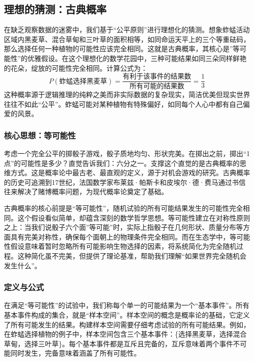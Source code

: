 \documentclass[
  twoside,12pt,fontset=none]{ctexbook}
\begin{document}
\hypertarget{ux7406ux60f3ux7684ux731cux6d4bux53e4ux5178ux6982ux7387}{%
\subsection{理想的猜测：古典概率}\label{ux7406ux60f3ux7684ux731cux6d4bux53e4ux5178ux6982ux7387}}

在缺乏观察数据的迷雾中，我们基于``公平原则''进行理想化的猜测。想象蚱蜢活动区域内黑麦草、混合草甸和三叶草的面积相等，如同命运天平上的三个等重砝码，那么选择任何一种植物的可能性应该完全相同。这就是古典概率，其核心是''等可能性''的优雅假设。在这个理想化的数学花园中，三种可能结果如同三朵同样鲜艳的花朵，绽放的可能性完全相同。计算公式为： \[P(\text{蚱蜢选择黑麦草}) = \frac{\text{有利于该事件的结果数}}{\text{所有可能的结果数}} = \frac{1}{3}\] 这种概率源于逻辑推理的纯粹之美而非实际数据的复杂现实，简洁优美但现实世界往往不如此``公平''。蚱蜢可能对某种植物有特殊偏好，如同每个人心中都有自己偏爱的风景。

\hypertarget{ux6838ux5fc3ux601dux60f3ux7b49ux53efux80fdux6027}{%
\subsubsection{核心思想：等可能性}\label{ux6838ux5fc3ux601dux60f3ux7b49ux53efux80fdux6027}}

考虑一个完全公平的掷骰子游戏，骰子质地均匀、形状完美。在掷出之前，掷出``1点''的可能性是多少？直觉告诉我们：六分之一。支撑这个直觉的是古典概率的思维方式。这是概率论中最古老、最直观的定义，源于对机会游戏的研究。古典概率的历史可追溯到17世纪，法国数学家布莱兹·帕斯卡和皮埃尔·德·费马通过书信往来解决了赌博概率问题，为现代概率论奠定了基础。

古典概率的核心前提是``等可能性''，随机试验的所有可能结果发生的可能性完全相同。这个假设看似简单，却蕴含深刻的数学哲学思想。等可能性建立在对称性原则之上：当我们说骰子六个面''等可能''时，实际上指骰子在几何形状、质量分布等方面具有完美对称性，确保每个面朝上的物理条件完全相同。而在生态学中，等可能性假设意味着暂时忽略所有可能影响生物选择的因素，将系统简化为完全随机过程。这种简化虽不完美，但提供了理论基准，帮助我们理解``如果世界完全随机会发生什么''。

\hypertarget{ux5b9aux4e49ux4e0eux516cux5f0f}{%
\subsubsection{定义与公式}\label{ux5b9aux4e49ux4e0eux516cux5f0f}}

在满足``等可能性''的试验中，我们称每个单一的可能结果为一个``基本事件''。所有基本事件构成的集合，就是``样本空间''。样本空间的概念是概率论的基础，它定义了所有可能发生的结果。构建样本空间需要仔细考虑试验的所有可能结果。例如，在蚱蜢选择植物的例子中，样本空间包含三个基本事件：\{选择黑麦草，选择混合草甸，选择三叶草\}。每个基本事件都是互斥且完备的，互斥意味着两个事件不可能同时发生，完备意味着涵盖了所有可能性。
\end{document}
